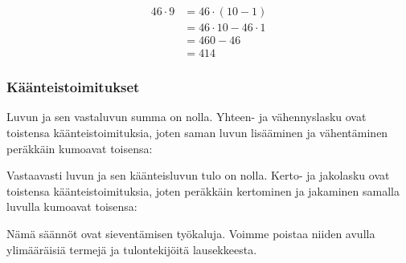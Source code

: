 \begin{esimerkki}
    \begin{align*}
46\cdot 9 &= 46\cdot (10-1) \\ &= 46\cdot 10 - 46\cdot 1 \\ &= 460-46 \\ &= 414
    \end{align*}
\end{esimerkki}

\subsubsection*{Käänteistoimitukset}

Luvun ja sen vastaluvun summa on nolla. Yhteen- ja vähennyslasku ovat toistensa käänteistoimituksia, joten saman
luvun lisääminen ja vähentäminen peräkkäin kumoavat toisensa:


Vastaavasti luvun ja sen käänteisluvun tulo on nolla. Kerto- ja jakolasku ovat toistensa käänteistoimituksia,
joten peräkkäin kertominen ja jakaminen samalla luvulla kumoavat toisensa:


Nämä säännöt ovat sieventämisen työkaluja. Voimme poistaa niiden avulla ylimääräisiä termejä ja tulontekijöitä lausekkeesta.

\begin{esimerkki} 
    \begin{alakohdat}
    \end{alakohdat}
\end{esimerkki}

